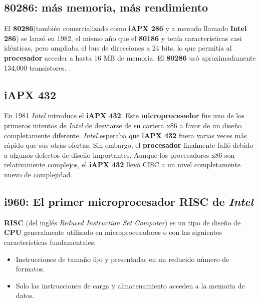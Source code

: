 \subsection{\textbf{80286}: más memoria, más rendimiento}
El \textbf{80286}(también comercializado como \textbf{iAPX 286} y a menudo llamado \textbf{Intel 286}) se lanzó en 1982, el mismo año que el \textbf{80186} y tenía
características casi idénticas, pero ampliaba el bus de direcciones a 24 bits, lo que permitía al \textbf{procesador} acceder a hasta 16 MB de memoria.
El \textbf{80286} usó aproximadamente 134,000 transistores. .

\subsection{\textbf{iAPX 432}}
En 1981 \emph{Intel}  introduce el \textbf{iAPX 432}. Este \textbf{microprocesador} fue uno de los primeros intentos de \emph{Intel} de desviarse de su cartera x86 a favor de un 
diseño completamente diferente. \emph{Intel} esperaba que \textbf{iAPX 432} fuera varias veces más rápido que sus otras ofertas. Sin embargo, el \textbf{procesador} 
finalmente falló debido a algunos defectos de diseño importantes. Aunque los procesadores x86 son relativamente complejos, el \textbf{iAPX 432} 
llevó CISC a un nivel completamente nuevo de complejidad.

\subsection{\textbf{i960}: El primer \textbf{microprocesador} \textbf{RISC} de \emph{Intel}}
\textbf{RISC} (del inglés \emph{Reduced Instruction Set Computer}) es un tipo de diseño de \textbf{CPU} generalmente utilizado en microprocesadores o 
con las siguientes características fundamentales:

\begin{itemize}
	\item Instrucciones de tamaño fijo y presentadas en un reducido número de formatos.
	\item Solo las instrucciones de carga y almacenamiento acceden a la memoria de datos.
\end{itemize}

